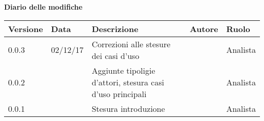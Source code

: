 \documentclass[AnalisiDeiRequisiti.tex]{subfiles}
\begin{document}
\huge \bfseries Diario delle modifiche\\
\begin{table}[htbp]
	\centering
	\renewcommand\arraystretch{1.2}

	\begin{tabularx}{\textwidth}{p{2cm}|p{2cm}|p{3cm}|p{2cm}|p{3cm}}
		\hline
		\textbf{Versione} & \textbf{Data} & \textbf{Descrizione} & \textbf{Autore} & \textbf{Ruolo}\\
		\hline
		0.0.3 & 02/12/17 & Correzioni alle stesure dei casi d'uso & \Gianluca & Analista \\
		\hline
		0.0.2 &  & Aggiunte tipoligie d'attori, stesura casi d'uso principali & \Mirco & Analista \\
		\hline
		0.0.1 &  & Stesura introduzione & \Mirco & Analista
	
	\end{tabularx}

\end{table}
\end{document}
